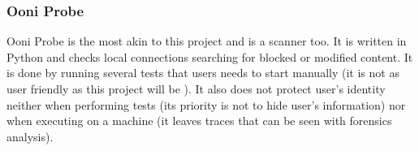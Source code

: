 \subsubsection{Ooni Probe}
Ooni Probe \cite{OoniProbe} is the most akin to this project and is a scanner too. It is written in Python and checks local connections searching for blocked or modified content. It is done by running several tests that users needs to start manually (it is not as user friendly as this project will be \cite{GitOoni}). It also does not protect user's identity neither when performing tests (its priority is not to hide user's information) nor when executing on a machine (it leaves traces that can be seen with forensics analysis).